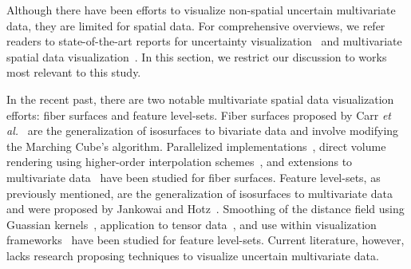 Although there have been efforts to visualize non-spatial uncertain multivariate data, they are limited for spatial data.
%
For comprehensive overviews, we refer readers to state-of-the-art reports for uncertainty visualization~\cite{Bonneau2014}  and multivariate spatial data visualization~\cite{he2019multivariate}.
%
In this section, we restrict our discussion to works most relevant to this study.

In the recent past, there are two notable multivariate spatial data visualization efforts: fiber surfaces and feature level-sets.
%
Fiber surfaces proposed by Carr \textit{et al.}~\cite{carr2015fiber} are the generalization of isosurfaces to bivariate data and involve modifying the Marching Cube's algorithm.
%
Parallelized implementations~\cite{klacansky2016fast}, direct volume rendering using higher-order interpolation schemes~\cite{wu2016direct}, and extensions to multivariate data~\cite{blecha2020fiber} have been studied for fiber surfaces.  
%
Feature level-sets, as previously mentioned, are the generalization of isosurfaces to multivariate data and were proposed by Jankowai and Hotz~\cite{jankowai2020feature}.
%
Smoothing of the distance field using Guassian kernels~\cite{nguyen2020visualization}, application to tensor data~\cite{jankowai2020tensor}, and use within visualization frameworks~\cite{jonsson2020inviwo} have been studied for feature level-sets.
%
%
Current literature, however, lacks research proposing techniques to visualize uncertain multivariate data.
%



